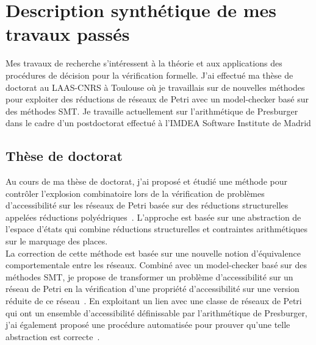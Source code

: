 \label{sec:recherche}

\vspace{10pt}
\section{Description synthétique de mes travaux passés}
\vspace{10pt}

Mes travaux de recherche s'intéressent à la théorie et aux applications des
procédures de décision pour la vérification formelle. J'ai effectué ma thèse de
doctorat au LAAS-CNRS à Toulouse où je travaillais sur de nouvelles méthodes
pour exploiter des réductions de réseaux de Petri avec un model-checker basé sur
des méthodes SMT. Je travaille actuellement sur l'arithmétique de Presburger
dans le cadre d'un postdoctorat effectué à l'IMDEA Software Institute de Madrid

\vspace{10pt}
\subsection{Thèse de doctorat}
\vspace{10pt}


Au cours de ma thèse de doctorat, j'ai proposé et étudié une méthode pour
contrôler l'explosion combinatoire lors de la vérification de problèmes
d'accessibilité sur les réseaux de Petri basée sur des réductions structurelles
appelées réductions polyédriques~\cite{amat_combination_2021,amat_polyhedral_2022}. L'approche est basée
sur une abstraction de l'espace d'états qui combine réductions structurelles et
contraintes arithmétiques sur le marquage des places.\\

La correction de cette méthode est basée sur une nouvelle notion d'équivalence
comportementale entre les réseaux. Combiné avec un model-checker basé sur des
méthodes SMT, je propose de transformer un problème d'accessibilité sur un
réseau de Petri en la vérification d'une propriété d'accessibilité sur une
version réduite de ce réseau~\cite{amat_combination_2021,amat_polyhedral_2022}. En exploitant un lien
avec une classe de réseaux de Petri qui ont un ensemble d'accessibilité
définissable par l'arithmétique de Presburger, j'ai également proposé
une procédure automatisée pour prouver qu'une telle abstraction est
correcte~\cite{amat_automated_2023}.\\

